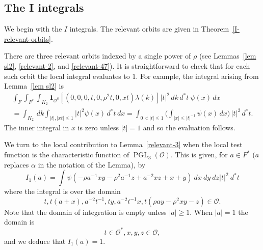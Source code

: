 \documentclass[12pt]{amsart}
\newcommand{\abs}[1]{\left|{#1}\right|}
\newcommand{\PGL}{\operatorname{PGL}}
\renewcommand{\O}{\mathcal{O}}
\theoremstyle{remark}
\begin{document}
\subsection{The I integrals}
We begin with the $I$ integrals.  The relevant orbits are given in Theorem~\ref{I-relevant-orbits}.  

There are three relevant orbits indexed by a single power of $\rho$
(see Lemmas~\ref{lem sl2}, \ref{relevant-2}, and \ref{relevant-47}).  
It is straightforward to check that for each such orbit the local integral evaluates to $1$.  
For example, the integral arising from Lemma~\ref{lem sl2} is
\begin{multline*}
\int_F\int_{F^*}\int_{K_2} \mathbf{1}_{\O^8}[(0,0,0,t,0,\rho^2t,0,xt)\lambda(k)]\abs{t}^2\,dk\, d^*t\ \psi(x) \,dx\\
=\int_{K_2}\,dk\int_{|t|, |xt|\leq1} |t|^2\psi(x)\,d^*t\,dx=\int_{0<|t|\leq1}\Big(\int_{|x|\leq |t|^{-1}} \psi(x)\,dx\Big)\,|t|^2\,d^*t.
\end{multline*}
The inner integral in $x$ is zero unless $|t|=1$ and so the evaluation follows.

We turn to the local contribution to
Lemma~\ref{relevant-3} when the local test function is the
characteristic function of $\PGL_3(\O)$.  This is given, for $a\in F^*$ ($a$ replaces $\alpha$ in the notation of the Lemma), by
\[
I_1(a)=\int \psi(-\rho a^{-1}xy-\rho^2a^{-1}z+a^{-2}xz+x+y)\ dx\ dy \ dz \abs{t}^2 \ d^*t
\]
where the integral is over the domain
\[
t,t(a+x),a^{-2}t^{-1},ty,a^{-2}t^{-1}x,t(\rho ay-\rho^2 xy-z)\in \O.
\]
Note that the domain of integration is empty unless $\abs{a}\ge 1$. When $\abs{a}=1$ the domain is 
\begin{equation}\label{degenerate-one}
t\in \O^*,x,y,z\in \O,
\end{equation}
and we deduce that $I_1(a)=1$. 
\end{document}
